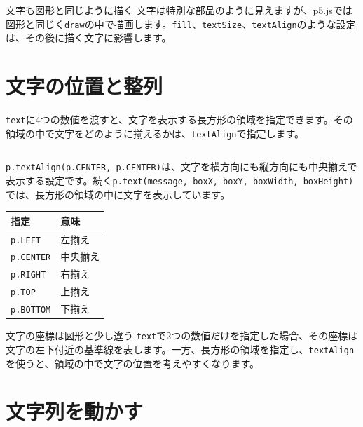 \begin{pointbox}{文字も図形と同じように描く}
文字は特別な部品のように見えますが、p5.jsでは図形と同じく\texttt{draw}の中で描画します。\texttt{fill}、\texttt{textSize}、\texttt{textAlign}のような設定は、その後に描く文字に影響します。
\end{pointbox}

\section{文字の位置と整列}

\texttt{text}に4つの数値を渡すと、文字を表示する長方形の領域を指定できます。その領域の中で文字をどのように揃えるかは、\texttt{textAlign}で指定します。

\begin{listing}[htbp]
\inputminted{ts}{typescript-p5/listings/chapter12/text-align-box.ts}
\caption{長方形の領域に文字を中央揃えで表示する（\texttt{chapter12/text-align-box.ts}）}
\label{lst:chapter12-text-align-box}
\end{listing}

\texttt{p.textAlign(p.CENTER, p.CENTER)}は、文字を横方向にも縦方向にも中央揃えで表示する設定です。続く\texttt{p.text(message, boxX, boxY, boxWidth, boxHeight)}では、長方形の領域の中に文字を表示しています。

\begin{center}
\begin{tabular}{ll}
\toprule
指定 & 意味 \\
\midrule
\texttt{p.LEFT} & 左揃え \\
\texttt{p.CENTER} & 中央揃え \\
\texttt{p.RIGHT} & 右揃え \\
\texttt{p.TOP} & 上揃え \\
\texttt{p.BOTTOM} & 下揃え \\
\bottomrule
\end{tabular}
\end{center}

\begin{notebox}{文字の座標は図形と少し違う}
\texttt{text}で2つの数値だけを指定した場合、その座標は文字の左下付近の基準線を表します。一方、長方形の領域を指定し、\texttt{textAlign}を使うと、領域の中で文字の位置を考えやすくなります。
\end{notebox}

\section{文字列を動かす}

